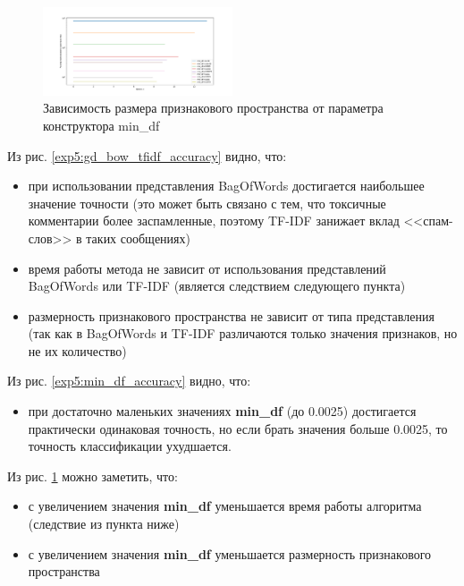 \documentclass[a4paper, 11pt]{article}
\begin{document}
            \begin{figure}[H] \label{exp5}
                    \begin{center}
                        \caption{Зависимость размера признакового пространства от параметра конструктора min\_df} \label{exp5:gd_bow_size_time}
                        \includegraphics[width=0.5\textwidth, height=0.25\textheight]{../graphs/GD_BOW_min_df_train_size.pdf}
                    \end{center}
            \end{figure}
            Из рис. \ref{exp5:gd_bow_tfidf_accuracy} видно, что:
            \begin{itemize}
                \item при использовании представления BagOfWords достигается наибольшее значение точности (это может быть связано с тем, что токсичные комментарии более заспамленные, поэтому TF-IDF занижает вклад <<спам-слов>> в таких сообщениях)
                \item время работы метода не зависит от использования представлений BagOfWords или TF-IDF (является следствием следующего пункта)
                \item размерность признакового пространства не зависит от типа представления (так как в BagOfWords и TF-IDF различаются только значения признаков, но не их количество)
            \end{itemize}
            
            Из рис. \ref{exp5:min_df_accuracy} видно, что:
                \begin{itemize}
                    \item при достаточно маленьких значениях \textbf{min\_df} (до 0.0025) достигается практически одинаковая точность, но если брать значения больше 0.0025, то точность классификации ухудшается.
                \end{itemize}   
                         
            Из рис. \ref{exp5:gd_bow_size_time} можно заметить, что:
            \begin{itemize}
                 \item с увеличением значения \textbf{min\_df} уменьшается время работы алгоритма (следствие из пункта ниже)
                 \item с увеличением значения \textbf{min\_df} уменьшается размерность признакового пространства
            \end{itemize}   
        
\end{document}
